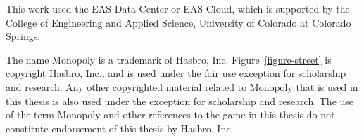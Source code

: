 This work used the EAS Data Center or EAS Cloud, which is supported by the
College of Engineering and Applied Science, University of Colorado at Colorado
Springs.

The name Monopoly is a trademark of Hasbro, Inc. Figure~\ref{figure-street} is
copyright Hasbro, Inc., and is used under the fair use exception for scholarship
and research. Any other copyrighted material related to Monopoly that is used in
this thesis is also used under the exception for scholarship and research.
The use of the term Monopoly and other references to the game in this thesis do
not constitute endorsement of this thesis by Hasbro, Inc.
